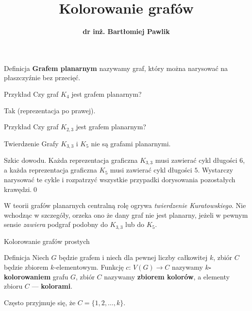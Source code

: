 \documentclass[a4paper,10pt]{beamer}
\title{\bf Kolorowanie grafów}
\author[B. Pawlik]{\bf dr inż. Bartłomiej Pawlik}
\begin{document}
\begin{frame}
\titlepage
\end{frame}

\begin{frame}

\begin{block}{Definicja}
{\bf Grafem planarnym} nazywamy graf, który można narysować na płaszczyźnie bez przecięć.
\end{block}


\begin{exampleblock}{Przykład}
Czy graf $K_4$ jest grafem planarnym?

\medskip

Tak (reprezentacja po prawej).

\begin{center}
	
\end{center}
\end{exampleblock}


\begin{exampleblock}{Przykład}
Czy graf $K_{2,3}$ jest grafem planarnym?
\end{exampleblock}



\end{frame}


\begin{frame}


\begin{block}{Twierdzenie}
Grafy $K_{3,3}$ i $K_5$ nie są grafami planarnymi.
\end{block}

\begin{block}{Szkic dowodu.}
Każda reprezentacja graficzna $K_{3,3}$ musi zawierać cykl długości $6$, a każda reprezentacja graficzna $K_{5}$ musi zawierać cykl długości $5$. Wystarczy narysować te cykle i rozpatrzyć wszystkie przypadki dorysowania pozostałych krawędzi.\hfill\qed
\end{block}

\medskip

W teorii grafów planarnych centralną rolę ogrywa {\it twierdzenie Kuratowskiego}. Nie wchodząc w szczegóły, orzeka ono że dany graf nie jest planarny, jeżeli w pewnym sensie {\it zawiera} podgraf podobny do $K_{3,3}$ lub do $K_5$.

\end{frame}


\begin{frame}{Kolorowanie grafów prostych}

	\begin{block}{Definicja}
		Niech $G$ będzie grafem i niech dla pewnej liczby całkowitej $k$, zbiór $C$ będzie zbiorem $k$-elementowym. Funkcję $c:\,V(G)\to C$ nazywamy {\bf $k$-kolorowaniem} grafu $G$, zbiór $C$ nazywamy {\bf zbiorem kolorów}, a elementy zbioru $C$ --- {\bf kolorami}.
	\end{block}

\medskip

Często przyjmuje się, że $C=\{1,2,\ldots,k\}$.

\end{frame}
\end{document}
